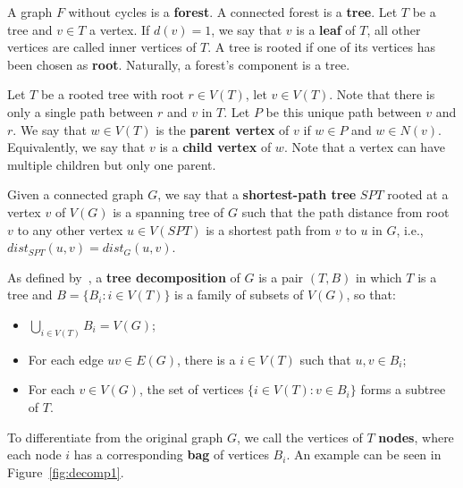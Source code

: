 A graph \(F\) without cycles is a \textbf{forest}. A connected forest is a \textbf{tree}. Let \(T\) be a tree and \(v \in T\) a vertex. If \(d(v) = 1\), we say that \(v\) is a \textbf{leaf} of \(T\), all other vertices are called inner vertices of \(T\). A tree is rooted if one of its vertices has been chosen as \textbf{root}. Naturally, a forest's component is a tree. 

Let \(T\) be a rooted tree with root \(r \in V(T)\), let \(v \in V(T)\). Note that there is only a single path between \(r\) and \(v\) in \(T\). Let \(P\) be this unique path between \(v\) and \(r\). We say that \(w \in V(T)\) is the \textbf{parent vertex} of \(v\) if \(w \in P\) and \(w \in N(v)\). Equivalently, we say that \(v\) is a \textbf{child vertex} of \(w\). Note that a vertex can have multiple children but only one parent.

Given a connected graph \(G\), we say that a \textbf{shortest-path tree} \(SPT\) rooted at a vertex \(v\) of \(V(G)\) is a spanning tree of \(G\) such that the path distance from root \(v\) to any other vertex \(u \in V(SPT)\) is a shortest path from \(v\) to \(u\) in \(G\), i.e., \(dist_{SPT}(u, v) = dist_{G}(u, v)\).

As defined by~\cite{ROBERTSON1986309}, a \textbf{tree decomposition} of \(G\) is a pair \((T, B)\) in which \(T\) is a tree and \(B = \{B_i \colon i \in V(T)\}\) is a family of subsets of \(V(G)\), so that:

\begin{itemize}
    \item \(\bigcup_{i \in V(T)} B_i = V(G)\);
    \item For each edge \(uv \in E(G)\), there is a \(i \in V(T)\) such that \(u, v \in B_i\);
    \item For each \(v \in V(G)\), the set of vertices \(\{i \in V(T) \colon v \in B_i\}\) forms a subtree of \(T\).
\end{itemize}

To differentiate from the original graph \(G\), we call the vertices of \(T\) \textbf{nodes}, where each node \(i\) has a corresponding \textbf{bag} of vertices \(B_i\). An example can be seen in Figure~\ref{fig:decomp1}.


